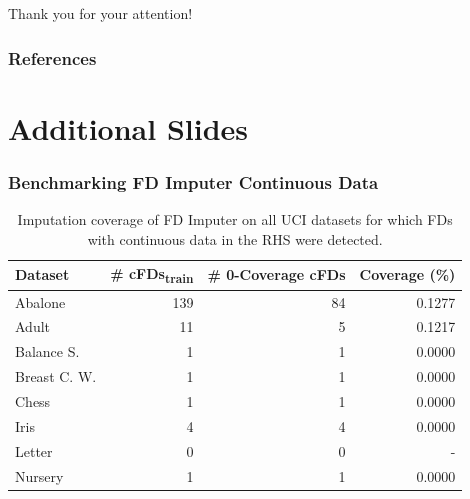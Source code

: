 \documentclass{beamer}
\begin{document}
\begin{frame}
    \begin{block}{}
        Thank you for your attention!
    \end{block}
\end{frame}
\begin{frame}[allowframebreaks]
\frametitle{References}
\printbibliography
\end{frame}

\section*{Additional Slides}
\begin{frame}
    \frametitle{Benchmarking FD Imputer Continuous Data}
    \begin{table}[ht]
        \centering
        \begin{tabular}{lrrr}
            \toprule
            \toprule
            Dataset & \# cFDs\textsubscript{train} & \# 0-Coverage cFDs  & Coverage (\%) \\
            \midrule
            Abalone & 139 & 84 & 0.1277 \\
            Adult & 11 & 5 & 0.1217 \\
            Balance S. & 1 & 1 & 0.0000 \\
            Breast C. W. & 1 & 1 & 0.0000 \\
            Chess & 1 & 1 & 0.0000 \\
            Iris & 4 & 4 & 0.0000 \\
            Letter & 0 & 0 & - \\
            Nursery & 1 & 1 & 0.0000 \\
            \bottomrule
            \bottomrule
        \end{tabular}
        \caption{Imputation coverage of FD Imputer on all UCI datasets for which FDs with continuous data in the RHS were detected.}\label{tab:fd-imputer-mse}
    \end{table}
\end{frame}
\end{document}
